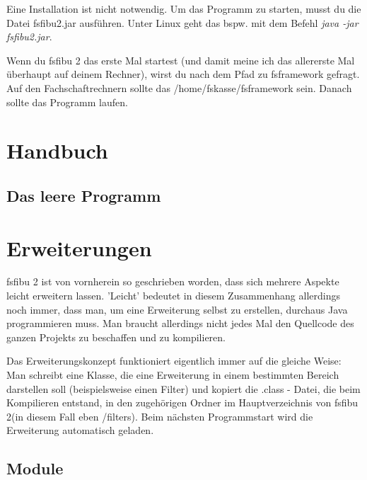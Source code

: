 \documentclass[a4paper,10pt,halfparskip,oneside,smallheadings]{scrbook}
\begin{document}
Eine Installation ist nicht notwendig. Um das Programm zu starten, musst du die Datei fsfibu2.jar ausführen. Unter Linux geht das bspw. mit dem Befehl \textit{java -jar fsfibu2.jar}.

Wenn du fsfibu 2 das erste Mal startest (und damit meine ich das allererste Mal überhaupt auf deinem Rechner), wirst 
du nach dem Pfad zu fsframework gefragt. Auf den Fachschaftrechnern sollte das /home/fskasse/fsframework sein. Danach sollte das Programm laufen.

\chapter{Handbuch}

\section{Das leere Programm}

\chapter{Erweiterungen}

fsfibu 2 ist von vornherein so geschrieben worden, dass sich mehrere Aspekte leicht erweitern lassen. 'Leicht' bedeutet in diesem Zusammenhang allerdings noch immer, dass man, um eine Erweiterung selbst zu erstellen, durchaus Java programmieren muss. Man braucht allerdings nicht jedes Mal den Quellcode des ganzen Projekts zu beschaffen und zu kompilieren.

Das Erweiterungskonzept funktioniert eigentlich immer auf die gleiche Weise: Man schreibt eine Klasse, die eine Erweiterung in einem bestimmten Bereich darstellen soll (beispielsweise einen Filter) und kopiert die .class - Datei, die beim Kompilieren entstand, in den zugehörigen Ordner im Hauptverzeichnis von fsfibu 2(in diesem Fall eben /filters). Beim nächsten Programmstart wird die Erweiterung automatisch geladen.

\section{Module}
\end{document}
